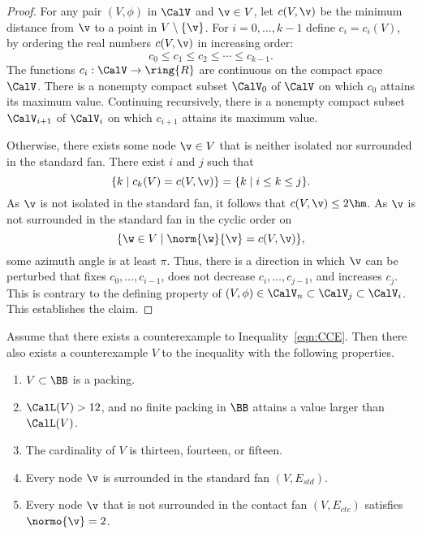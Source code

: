 \begin{proof}
For any pair $(V,\phi)$ in $\CalV$ and $\v\in V$, let
$c(V,\v)$ be the minimum distance from $\v$ to a point in
$V\setminus \{\v\}$.  For $i=0,\ldots,k-1$ define
$c_i=c_i(V)$, by ordering the real numbers
$c(V,\v)$  in increasing order:
\[ 
c_0 \le c_1 \le c_2 \le \cdots \le c_{k-1}.
\] 
The functions $c_i:\CalV\to\ring{R}$ are  continuous on the
compact  space $\CalV$.  There is a nonempty compact
subset $\CalV_0$ of $\CalV$ on which $c_0$ attains its maximum
value. Continuing recursively, there is a nonempty compact subset
$\CalV_{i+1}$ of $\CalV_{i}$ on which $c_{i+1}$ attains its maximum value.
%


Otherwise, there exists some node $\v\in V$ 
that is neither isolated nor surrounded in the standard fan.
There exist $i$ and $j$ such that
\[ 
\{k\mid c_k(V) = c(V,\v)\} = \{k\mid i\le k\le j\}.
\] 
As $\v$ is not isolated in the standard fan, it
follows that $c(V,\v) \le 2\hm$.  As $\v$ is not surrounded in the
standard fan in the cyclic order on
\[ 
\{\w\in V \mid \norm{\w}{\v} = c(V,\v)\},
\] 
some azimuth angle is at least $\pi$.
Thus, there is a direction in which $\v$ can be perturbed
that  fixes $c_0,\ldots,c_{i-1}$, does not decrease $c_i,\ldots,c_{j-1}$, and increases $c_j$.
This is contrary to the defining property of
$(V,\phi)\in\CalV_n\subset\CalV_j\subset\CalV_i$.  This establishes the claim.
\end{proof}



\begin{lemma}[]\label{lemma:CE} 
  Assume that there exists a counterexample to
  Inequality~\ref{eqn:CCE}.  Then there also exists a counterexample
  $V$ to the inequality with the following properties.
\begin{enumerate}\wasitemize 
\item $V\subset \BB$ is a packing.
\item $\CalL(V) > 12$, and no finite packing in $\BB$ attains a value
  larger than $\CalL(V)$.
\item The cardinality of $V$ is thirteen, fourteen, or fifteen.
\item Every node $\v$ is surrounded in the standard fan $(V,E_{std})$.
\item Every node $\v$ that is not surrounded in the contact fan $(V,E_{ctc})$ satisfies $\normo{\v}=2$.
\end{enumerate}\wasitemize 
\end{lemma}
%

